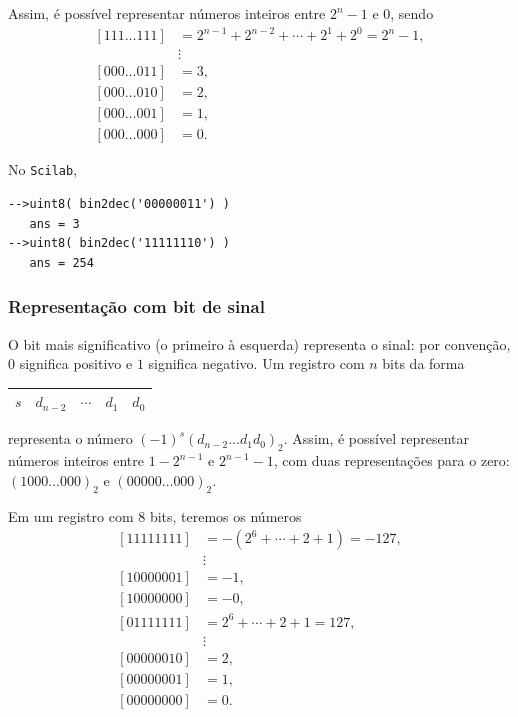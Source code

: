 Assim, é possível representar números inteiros entre $2^n-1$ e $0$, sendo
\begin{equation}
\begin{split}
  [111\ldots 111] & = 2^{n-1}+2^{n-2}+\cdots+2^1+2^0=2^n-1,\\
                &\vdots\\
  [000\ldots 011] &= 3, \\
  [000\ldots 010] &= 2, \\
  [000\ldots 001] &= 1, \\
  [000\ldots 000] & = 0.
\end{split}
\end{equation}

\ifisscilab
\begin{ex}
  No \verb+Scilab+,
\begin{verbatim}
-->uint8( bin2dec('00000011') )
   ans = 3
-->uint8( bin2dec('11111110') )
   ans = 254
\end{verbatim}
\end{ex}
\fi

\subsubsection{Representação com bit de sinal}
O bit mais significativo (o primeiro à esquerda) representa o sinal: por convenção, $0$ significa positivo e $1$ significa negativo. Um registro com $n$ bits da forma
\begin{center}
  \begin{tabular}{|c|c|c|c|c|} \hline
    $s$ & $d_{n-2}$ & $\cdots$ & $d_1$ & $d_0$ \\\hline
  \end{tabular}
\end{center}
representa o número $(-1)^s(d_{n-2}\ldots d_1d_0)_2$. Assim, é possível representar números inteiros entre $1-2^{n-1}$ e $2^{n-1}-1$, com duas representações para o zero: $(1000\ldots 000)_2$ e $(00000\ldots 000)_2$.

\begin{ex}
Em um registro com $8$ bits, teremos os números
\begin{equation}
\begin{split}
 [11111111] &= -(2^{6}+\cdots+2+1)=-127,\\
 &\vdots    \\
 [10000001] &= -1, \\
 [10000000] &= -0, \\
 [01111111] &= 2^6+\cdots+2+1=127, \\
 &\vdots    \\
 [00000010] &= 2, \\
 [00000001] &= 1, \\
 [00000000] &= 0.
\end{split}
\end{equation}
\end{ex}


